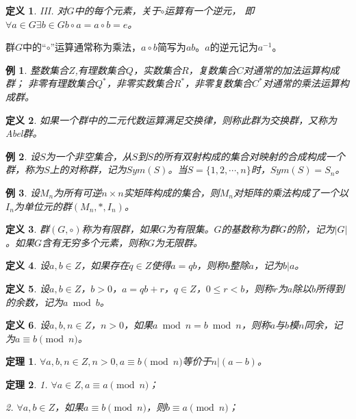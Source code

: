 \documentclass{article}
\newtheorem{Def}{定义}
\newtheorem{Thm}{定理}
\newtheorem*{Example}{例}
\begin{document}
\begin{CJK*}{UTF8}{gbsn}
\begin{Def}
    III. 对$G$中的每个元素，关于$\circ$运算有一个逆元，
    即$\forall a\in G \exists b\in G b\circ a = a\circ b= e$。
  \end{Def}
  群$G$中的“$\circ$”运算通常称为乘法，$a\circ b$简写为$ab$。$a$的逆元记为$a^{-1}$。
  \begin{Example}
    整数集合$Z$,有理数集合$Q$，实数集合$R$，复数集合$C$对通常的加法运算构成群；
    非零有理数集合$Q^*$，非零实数集合$R^*$，非零复数集合$C^*$对通常的乘法运算构成群。
  \end{Example}
  \begin{Def}
    如果一个群中的二元代数运算满足交换律，则称此群为交换群，又称为Abel群。
  \end{Def}
  \begin{Example}
  设$S$为一个非空集合，从$S$到$S$的所有双射构成的集合对映射的合成构成一个群，称为$S$上的对称群，记为$Sym(S)$。当$S=\{1,2,\cdots,n\}$时，$Sym(S)=S_n$。
  \end{Example}
    \begin{Example}
      设$M_n$为所有可逆$n\times n$实矩阵构成的集合，则$M_n$对矩阵的乘法构成了一个以$I_n$为单位元的群$(M_n,*,I_n)$。
    \end{Example}
  \begin{Def}
    群$(G,\circ)$称为有限群，如果$G$为有限集。$G$的基数称为群$G$的阶，记为$|G|$。如果$G$含有无穷多个元素，则称$G$为无限群。
  \end{Def}
  
  \begin{Def}
    设$a,b\in Z$，如果存在$q\in Z$使得$a=qb$，则称$b$整除$a$，记为$b|a$。
  \end{Def}
  \begin{Def}
    设$a,b\in Z$，$b>0$，$a=qb+r$，$q\in Z$，$0\leq r<b$，则称$r$为$a$除以$b$所得到的余数，记为$a\bmod b$。
  \end{Def}
  
  \begin{Def}
    设$a,b,n\in Z$，$n>0$，如果$a\bmod n=b\bmod n$，则称$a$与$b$模$n$同余，记为$a \equiv b\pmod{n}$。
  \end{Def}
  
  
  \begin{Thm}
    $\forall a,b,n\in Z, n>0, a\equiv b\pmod{n}$等价于$n|(a-b)$。
  \end{Thm}
  
  \begin{Thm}
    1. $\forall a\in Z, a \equiv a \pmod{n}$；
  
    2. $\forall a, b\in Z$，如果$a\equiv b \pmod{n}$，则$b\equiv a\pmod{n}$；
  

\end{Thm}
\end{CJK*}
\end{document}

